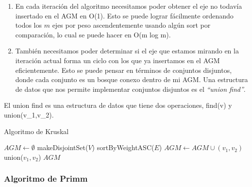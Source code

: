 \begin{enumerate}
\item En cada iteraci\'on del algoritmo necesitamos poder obtener el eje no todav\'ia insertado en el AGM en O(1). Esto se puede lograr f\'acilmente ordenando todos los $m$ ejes por peso ascendentemente usando alg\'un sort por comparaci\'on, lo cual se puede hacer en O(m log m).
\item Tambi\'en necesitamos poder determinar si el eje que estamos mirando en la iteraci\'on actual forma un ciclo con los que ya insertamos en el AGM eficientemente. Esto se puede pensar en t\'erminos de conjuntos disjuntos, donde cada conjunto es un bosque conexo dentro de mi AGM. Una estructura de datos que nos permite implementar conjuntos disjuntos es el \emph{``union find''}.
\end{enumerate}

El union find es una estructura de datos que tiene dos operaciones, find(v) y union(v_1,v_2).


\begin{algorithm}
\caption{Algoritmo de Kruskal}
\begin{algorithmic}[1]
\State $AGM \gets \emptyset$
  \State makeDisjointSet($V$)
\EndFor
\State sortByWeightASC($E$)
    \State $AGM \gets AGM \cup (v_1, v_2)$
    \State union($v_1, v_2$)
  \EndIf
\EndFor
\Return $AGM$
\end{algorithmic}
\end{algorithm}

\newpage
\subsubsection{Algoritmo de Primm}

